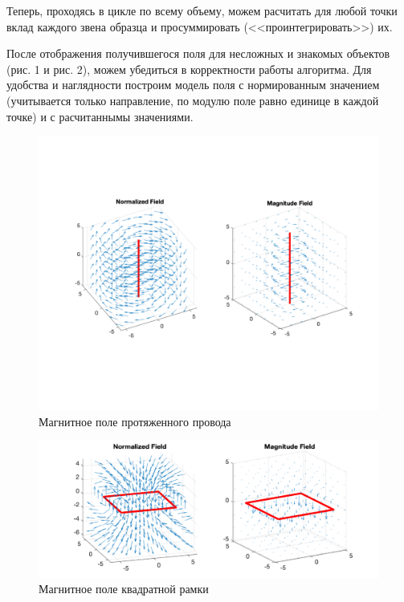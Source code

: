 \documentclass[12pt,a4paper]{article}
\begin{document}
Теперь, проходясь в цикле по всему объему, можем расчитать для любой точки вклад каждого звена образца и просуммировать (<<проинтегрировать>>) их.

После отображения получившегося поля для несложных и знакомых объектов (рис. 1 и рис. 2), можем убедиться в корректности работы алгоритма.
Для удобства и наглядности построим модель поля с нормированным значением (учитывается только направление, по модулю поле равно единице в каждой точке) и с расчитаннымы значениями.


\begin{figure}[H]
    \centering
    \includegraphics[width=\linewidth]{pics/linear.pdf}
    \caption{Магнитное поле протяженного провода}
\end{figure}

\begin{figure}[H]
    \centering
    \includegraphics[width=\linewidth]{pics/square.pdf}
    \caption{Магнитное поле квадратной рамки}
\end{figure}
\end{document}
